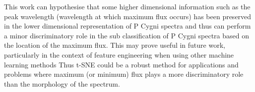 This work can hypothesise that some higher dimensional information such as the peak wavelength (wavelength at which maximum flux occurs) has been preserved in the lower dimensional representation of P Cygni spectra and thus can perform a minor discriminatory role in the sub classification of P Cygni spectra based on the location of the maximum flux. This may prove useful in future work, particularly in the context of feature engineering when using other machine learning methods Thus t-SNE could be a robust method for applications and problems where maximum (or minimum) flux plays a more discriminatory role than the morphology of the spectrum.